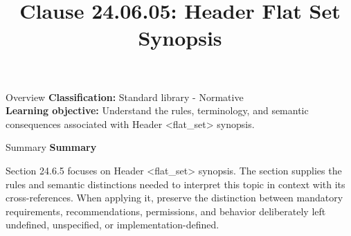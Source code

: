 \documentclass[10pt,letterpaper]{article}
\title{Clause 24.06.05: Header Flat Set Synopsis}
\author{}
\date{}
\begin{document}
\maketitle
\begin{CornellOverviewBox}{Overview}
\textbf{Classification:} Standard library - Normative\\[2pt]
\textbf{Learning objective:} Understand the rules, terminology, and semantic consequences associated with Header <flat\_set> synopsis.
\end{CornellOverviewBox}\begin{CornellSummaryBox}{Summary}
{\sffamily\bfseries\color{Accent} Summary}\par\vspace{3pt}Section 24.6.5 focuses on Header <flat\_set> synopsis. The section supplies the rules and semantic distinctions needed to interpret this topic in context with its cross-references. When applying it, preserve the distinction between mandatory requirements, recommendations, permissions, and behavior deliberately left undefined, unspecified, or implementation-defined.
\end{CornellSummaryBox}
\end{document}
